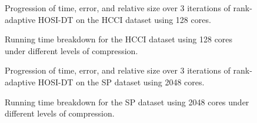         \begin{figure}
            \centering
            \renewcommand{\datapath}{data/HCCI/N1_n128}
            \renewcommand{\thresh}{1e-01,5e-02,1e-02}
            
            \caption[HCCI Dataset - Progression of Time, Error, and Relative Size]{Progression of time, error, and relative size over 3 iterations of rank-adaptive HOSI-DT on the HCCI dataset using 128 cores.}
            \label{fig:HCCI}
        \end{figure}
        \begin{figure}
            \centering
            \renewcommand{\datapath}{data/HCCI/N1_n128}
            \renewcommand{\thresh}{1e-01,5e-02,1e-02}
            
            \caption[HCCI - Running Time Breakdown]{Running time breakdown for the HCCI dataset using 128 cores under different levels of compression.}
            \label{fig:HCCI_breakdown}
        \end{figure}
        

        \begin{figure}
            \centering
            \renewcommand{\datapath}{data/SP/N16_n2048}
            \renewcommand{\thresh}{1e-01,5e-02,1e-02}
            
            \caption[SP Dataset - Progression of Time, Error, and Relative Size]{Progression of time, error, and relative size over 3 iterations of rank-adaptive HOSI-DT on the SP dataset using 2048 cores.}
            \label{fig:SP}
        \end{figure}

        \begin{figure}
            \centering
            \renewcommand{\datapath}{data/SP/N16_n2048}
            \renewcommand{\thresh}{1e-01,5e-02,1e-02}
            
            \caption[SP Dataset - Running Time Breakdown]{Running time breakdown for the SP dataset using 2048 cores under different levels of compression.}
            \label{fig:SP_breakdown}
        \end{figure}


